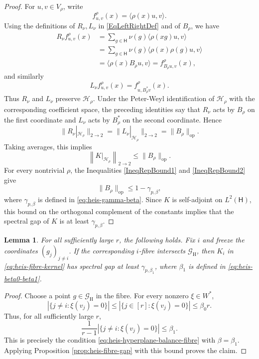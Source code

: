 \documentclass[11pt, reqno]{amsart}
\numberwithin{equation}{section}
\newtheorem{lemma}[theorem]{Lemma}
\newcommand{\Heis}{\mathsf H}
\newcommand{\Good}{\mathcal G}
\begin{document}
\begin{proof}
For \(u,v\in V_\rho\), write
\[
    f_{u,v}^{\rho}(x)=\langle \rho(x)u,v\rangle .
\]
Using the definitions of \(R_\nu,L_\nu\) in \eqref{EqLeftRightDef} and of
\(B_\rho\), we have
\[
\begin{aligned}
    R_\nu f_{u,v}^{\rho}(x)
    &=
    \sum_{g\in\Heis}\nu(g)\langle \rho(xg)u,v\rangle  \\
    &=
    \sum_{g\in\Heis}\nu(g)\langle \rho(x)\rho(g)u,v\rangle  \\
    &=
    \langle \rho(x)B_\rho u,v\rangle
    =
    f_{B_\rho u,v}^{\rho}(x),
\end{aligned}
\]
and similarly
\[
L_\nu f_{u,v}^{\rho}(x)   =f_{u,B_\rho^*v}^{\rho}(x).
\]
Thus \(R_\nu\) and \(L_\nu\) preserve \(\mathcal H_\rho\).  Under the
Peter-Weyl identification of \(\mathcal H_\rho\) with the corresponding
coefficient space, the preceding identities say that \(R_\nu\) acts by
\(B_\rho\) on the first coordinate and \(L_\nu\) acts by \(B_\rho^*\) on the
second coordinate.  Hence
\[
    \|R_\nu|_{\mathcal H_\rho}\|_{2\to2}
    =
    \|L_\nu|_{\mathcal H_\rho}\|_{2\to2}
    =
    \|B_\rho\|_{\operatorname{op}}.
\]
Taking averages, this implies
\[
    \left\|K|_{\mathcal H_\rho}\right\|_{2\to2}
    \le \|B_\rho\|_{\operatorname{op}}.
\]
For every nontrivial \(\rho\), the Inequalities \eqref{IneqRepBound1} and \eqref{IneqRepBound2} give
\[
    \|B_\rho\|_{\operatorname{op}}
    \le 1-\gamma_{p,\beta},
\]
where \(\gamma_{p,\beta}\) is defined in \eqref{eq:heis-gamma-beta}.  Since
\(K\) is self-adjoint on \(L^2(\Heis)\), this bound on the orthogonal
complement of the constants implies that the spectral gap of
\(K\) is at least \(\gamma_{p,\beta}\).

\end{proof}

\begin{lemma}\label{lem:heis-good-fibre-gap}
For all sufficiently large \(r\), the following holds.  Fix \(i\) and freeze the
coordinates \((g_j)_{j\ne i}\).  If the corresponding \(i\)-fibre intersects
\(\Good_{\mathrm H}\), then \(K_i\) in \eqref{eq:heis-fibre-kernel} has spectral
gap at least \(\gamma_{p,\beta_1}\), where \(\beta_1\) is defined in
\eqref{eq:heis-beta0-beta1}.
\end{lemma}

\begin{proof}
Choose a point \(g\in\Good_{\mathrm H}\) in the fibre.  For every nonzero
\(\xi\in W^*\),
\[
    |\{j\ne i:\xi(v_j)=0\}|
    \le |\{j\in[r]:\xi(v_j)=0\}|
    \le\beta_0r.
\]
Thus, for all sufficiently large \(r\),
\[
    \frac1{r-1}|\{j\ne i:\xi(v_j)=0\}|\le\beta_1.
\]
This is precisely the condition
\eqref{eq:heis-hyperplane-balance-fibre} with \(\beta=\beta_1\).  Applying Proposition
\ref{prop:heis-fibre-gap} with this bound proves the claim.
\end{proof}
\end{document}
